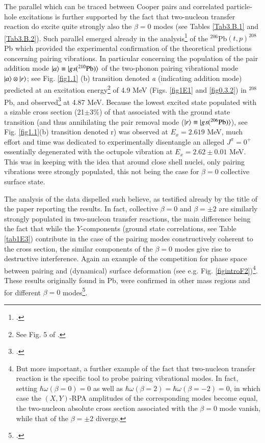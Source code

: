  The parallel which can be traced between Cooper pairs and correlated particle-hole excitations is further supported by the fact that two-nucleon transfer reaction do excite quite strongly also the $\beta=0$ modes (see Tables \ref{Tab3.B.1} and \ref{Tab3.B.2}). 
Such parallel  emerged already in the analysis\footnote{\cite{Broglia:67}.} of the $^{206}$Pb$(t,p)^{208}$Pb which provided the experimental confirmation of the theoretical predictions concerning pairing vibrations. In particular concerning the population of the pair addition mode $|{a} \rangle\equiv|{gs(^{210}\text{Pb})} \rangle$ of the two-phonon pairing vibrational mode $|{a} \rangle\otimes|{r} \rangle$; see Fig. \ref{fig1.1} (b) transition denoted \emph{a} (indicating addition mode)  predicted at an excitation energy\footnote{See Fig. 5 of \cite{Bes:66}.} of 4.9 MeV (Figs. \ref{fig1E1} and \ref{fig0.3.2}) in $^{208}$Pb, and observed\footnote{\cite{Bjerregaard:66b}.} at 4.87 MeV. Because the lowest excited state populated with a sizable cross section (21$\pm3\%$) of that associated with the ground state transition (and thus annihilating the pair removal mode ($|{r} \rangle\equiv|{gs(^{206}\text{Pb})} \rangle$), see Fig. \ref{fig1.1}(b) transition denoted r) was observed at $E_x=2.619$ MeV, much effort and time was dedicated to experimentally disentangle an alleged $J^\pi=0^+$ essentially degenerated with the octupole vibration at $E_x=2.62\pm0.01$ MeV.  This was in keeping with the idea that around close shell nuclei, only pairing vibrations were strongly populated, this not being the case for $\beta=0$ collective surface state. 

The analysis of the data dispelled such believe, as testified already by the title of the paper reporting the results. In fact, collective $\beta=0$ and $\beta=\pm2$ are similarly strongly populated in two-nucleon transfer reactions, the main difference being the fact that while the $Y$-components (ground state correlations, see Table  \ref{tab1E3}) contribute in the case of the pairing modes constructively coherent to the cross section, the similar components of the $\beta=0$ modes give rise to destructive interference. Again an example of the competition for phase space between pairing and (dynamical) surface deformation (see e.g. Fig. \ref{figintroF2})\footnote{But more important, a further example of the fact that two-nucleon transfer reaction is the specific tool to probe pairing vibrational modes. In fact, setting $\hbar\omega(\beta=0)=0$ as well as $\hbar\omega(\beta=2)=\hbar\omega(\beta=-2)=0$, in which case the $(X,Y)$-RPA amplitudes of the corresponding modes become equal, the two-nucleon absolute cross section associated with the $\beta=0$ mode vanish, while that of the $\beta=\pm2$ diverge.}. These results originally found in Pb, were confirmed in other mass regions and for different $\beta=0$ modes\footnote{\cite{Broglia:71}.}. 


